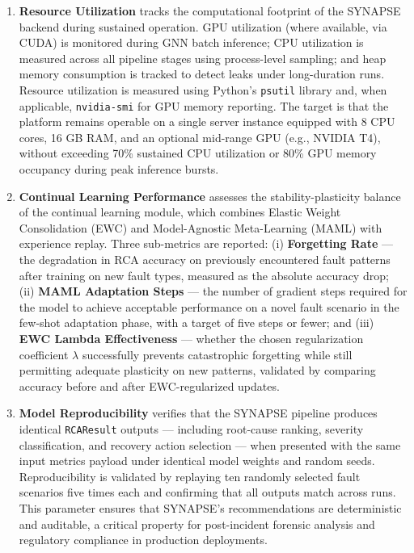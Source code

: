 \begin{enumerate}[label=\textbf{\Alph*.},leftmargin=1.2cm]
    \item \textbf{Resource Utilization} tracks the computational footprint of the SYNAPSE backend during sustained operation. GPU utilization (where available, via CUDA) is monitored during GNN batch inference; CPU utilization is measured across all pipeline stages using process-level sampling; and heap memory consumption is tracked to detect leaks under long-duration runs. Resource utilization is measured using Python's \texttt{psutil} library and, when applicable, \texttt{nvidia-smi} for GPU memory reporting. The target is that the platform remains operable on a single server instance equipped with 8 CPU cores, 16 GB RAM, and an optional mid-range GPU (e.g., NVIDIA T4), without exceeding 70\% sustained CPU utilization or 80\% GPU memory occupancy during peak inference bursts.

    \item \textbf{Continual Learning Performance} assesses the stability-plasticity balance of the continual learning module, which combines Elastic Weight Consolidation (EWC) and Model-Agnostic Meta-Learning (MAML) with experience replay. Three sub-metrics are reported: (i) \textbf{Forgetting Rate} — the degradation in RCA accuracy on previously encountered fault patterns after training on new fault types, measured as the absolute accuracy drop; (ii) \textbf{MAML Adaptation Steps} — the number of gradient steps required for the model to achieve acceptable performance on a novel fault scenario in the few-shot adaptation phase, with a target of five steps or fewer; and (iii) \textbf{EWC Lambda Effectiveness} — whether the chosen regularization coefficient $\lambda$ successfully prevents catastrophic forgetting while still permitting adequate plasticity on new patterns, validated by comparing accuracy before and after EWC-regularized updates.

    \item \textbf{Model Reproducibility} verifies that the SYNAPSE pipeline produces identical \texttt{RCAResult} outputs — including root-cause ranking, severity classification, and recovery action selection — when presented with the same input metrics payload under identical model weights and random seeds. Reproducibility is validated by replaying ten randomly selected fault scenarios five times each and confirming that all outputs match across runs. This parameter ensures that SYNAPSE's recommendations are deterministic and auditable, a critical property for post-incident forensic analysis and regulatory compliance in production deployments.

\end{enumerate}

